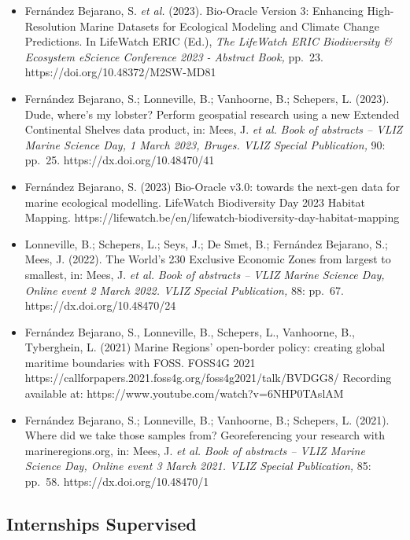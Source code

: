 \documentclass[
  16,
]{article}
\providecommand{\tightlist}{%
  \setlength{\itemsep}{0pt}\setlength{\parskip}{0pt}}\usepackage{longtable,booktabs,array}
\begin{document}
\begin{itemize}
\tightlist
\item
  Fernández Bejarano, S. \emph{et al.} (2023). Bio-Oracle Version 3:
  Enhancing High-Resolution Marine Datasets for Ecological Modeling and
  Climate Change Predictions. In LifeWatch ERIC (Ed.), \emph{The
  LifeWatch ERIC Biodiversity \& Ecosystem eScience Conference 2023 -
  Abstract Book,} pp.~23. https://doi.org/10.48372/M2SW-MD81
\item
  Fernández Bejarano, S.; Lonneville, B.; Vanhoorne, B.; Schepers, L.
  (2023). Dude, where's my lobster? Perform geospatial research using a
  new Extended Continental Shelves data product, in: Mees, J. \emph{et
  al.} \emph{Book of abstracts -- VLIZ Marine Science Day, 1 March 2023,
  Bruges. VLIZ Special Publication,} 90: pp.~25.
  https://dx.doi.org/10.48470/41
\item
  Fernández Bejarano, S. (2023) Bio-Oracle v3.0: towards the next-gen
  data for marine ecological modelling. LifeWatch Biodiversity Day 2023
  Habitat Mapping.
  https://lifewatch.be/en/lifewatch-biodiversity-day-habitat-mapping
\item
  Lonneville, B.; Schepers, L.; Seys, J.; De Smet, B.; Fernández
  Bejarano, S.; Mees, J. (2022). The World's 230 Exclusive Economic
  Zones from largest to smallest, in: Mees, J. \emph{et al.} \emph{Book
  of abstracts -- VLIZ Marine Science Day, Online event 2 March 2022.
  VLIZ Special Publication,} 88: pp.~67. https://dx.doi.org/10.48470/24
\item
  Fernández Bejarano, S., Lonneville, B., Schepers, L., Vanhoorne, B.,
  Tyberghein, L. (2021) Marine Regions' open-border policy: creating
  global maritime boundaries with FOSS. FOSS4G 2021
  https://callforpapers.2021.foss4g.org/foss4g2021/talk/BVDGG8/
  Recording available at: https://www.youtube.com/watch?v=6NHP0TAslAM
\item
  Fernández Bejarano, S.; Lonneville, B.; Vanhoorne, B.; Schepers, L.
  (2021). Where did we take those samples from? Georeferencing your
  research with marineregions.org, in: Mees, J. \emph{et al.} \emph{Book
  of abstracts -- VLIZ Marine Science Day, Online event 3 March 2021.
  VLIZ Special Publication,} 85: pp.~58. https://dx.doi.org/10.48470/1
\end{itemize}

\hypertarget{internships-supervised}{%
\subsection{Internships Supervised}\label{internships-supervised}}
\end{document}
